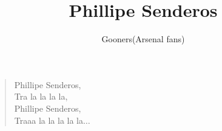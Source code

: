 \documentclass[a4paper,12pt]{article}
\title{Phillipe Senderos}
\author{Gooners(Arsenal fans)}
\date{}
\begin{document}
	
	\maketitle
	
	\begin{verse}
		
		Phillipe Senderos, \\
		Tra la la la la, \\
		Phillipe Senderos, \\
		Traaa la la la la la$\ldots$
		
	\end{verse}
	
\end{document}
